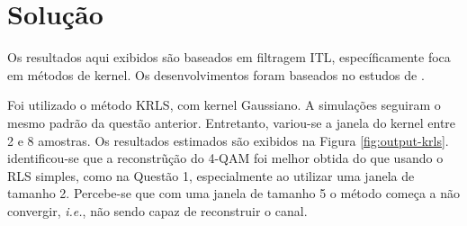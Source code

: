 \documentclass[review]{elsarticle}
\begin{document}
\section{Solução}

Os resultados aqui exibidos são baseados em filtragem ITL, específicamente foca em métodos de kernel. Os desenvolvimentos foram baseados no estudos de \cite{vanvaerenbergh2013comparative}.

Foi utilizado o método KRLS, com kernel Gaussiano. A simulações seguiram o mesmo padrão da questão anterior. Entretanto, variou-se a janela do kernel entre 2 e 8 amostras. Os resultados estimados são exibidos na Figura \ref{fig:output-krls}. identificou-se que a reconstrũção do 4-QAM foi melhor obtida do que usando o RLS simples, como na Questão 1, especialmente ao utilizar uma janela de tamanho 2. Percebe-se que com uma janela de tamanho 5 o método começa a não convergir, \emph{i.e.}, não sendo capaz de reconstruir o canal.
\end{document}
